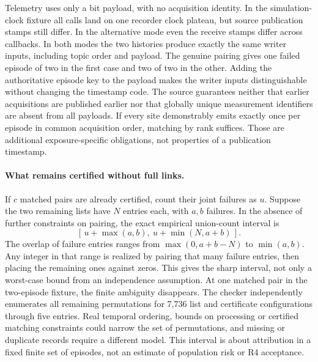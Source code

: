 \documentclass{article}
\begin{document}
Telemetry uses only a bit payload, with no acquisition identity.
In the simulation-clock fixture all calls land on one recorder clock
plateau, but source publication stamps still differ. In the alternative
mode even the receive stamps differ across callbacks. In both modes
the two histories produce exactly the same writer inputs, including
topic order and payload. The genuine pairing gives one failed episode
of two in the first case and two of two in the other.
Adding the authoritative episode key to the payload makes the writer
inputs distinguishable without changing the timestamp code.
The source guarantees neither that earlier acquisitions are published
earlier nor that globally unique measurement identifiers are absent from
all payloads. If every site demonstrably emits exactly once per episode
in common acquisition order, matching by rank suffices. Those are
additional exposure-specific obligations, not properties of a
publication timestamp.

\paragraph{What remains certified without full links.}
If \(c\) matched pairs are already certified, count their joint failures
as \(u\). Suppose the two remaining lists have \(N\) entries each,
with \(a,b\) failures. In the absence of further constraints on pairing,
the exact empirical union-count interval is
\[
     [\,u+\max(a,b),\ u+\min(N,a+b)\,].
\]
The overlap of failure entries ranges from \(\max(0,a+b-N)\) to
\(\min(a,b)\). Any integer in that range is realized by pairing that
many failure entries, then placing the remaining ones against zeros.
This gives the sharp interval, not only a worst-case bound from an
independence assumption. At one matched pair in the two-episode
fixture, the finite ambiguity disappears. The checker independently
enumerates all remaining permutations for 7,736 list and certificate
configurations through five entries. Real temporal ordering, bounds
on processing or certified matching constraints could narrow the set
of permutations, and missing or duplicate records require a different
model. This interval is about attribution in a fixed finite set of
episodes, not an estimate of population risk or R4 acceptance.
\end{document}
